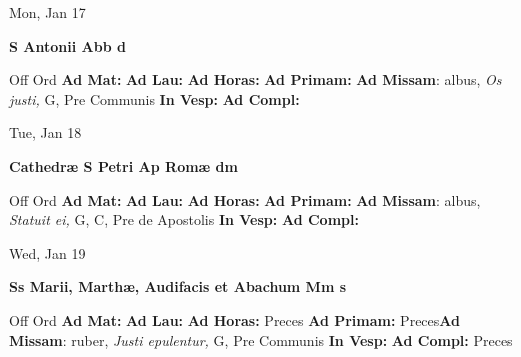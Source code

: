 \documentclass[10pt]{memoir}
\begin{document}
\begin{center}
\begin{minipage}{3.5in}
\vspace{2em}
\begin{center}Mon, Jan 17
\end{center}
\textbf{ \large S Antonii Abb
\textnormal{\normalsize d}}

\begin{justify}Off Ord
\textbf{Ad Mat: }
\textbf{Ad Lau: }
\textbf{Ad Horas: }
\textbf{Ad Primam: }\textbf{Ad Missam}: albus, \textit{Os justi,} G, Pre Communis
\textbf{In Vesp: }
\textbf{Ad Compl: }
\end{justify}
\end{minipage}
\end{center}

\begin{center}
\begin{minipage}{3.5in}
\vspace{2em}
\begin{center}Tue, Jan 18
\end{center}
\textbf{ \large Cathedræ S Petri Ap Romæ
\textnormal{\normalsize dm}}

\begin{justify}Off Ord
\textbf{Ad Mat: }
\textbf{Ad Lau: }
\textbf{Ad Horas: }
\textbf{Ad Primam: }\textbf{Ad Missam}: albus, \textit{Statuit ei,} G, C, Pre de Apostolis
\textbf{In Vesp: }
\textbf{Ad Compl: }
\end{justify}
\end{minipage}
\end{center}

\begin{center}
\begin{minipage}{3.5in}
\vspace{2em}
\begin{center}Wed, Jan 19
\end{center}
\textbf{ \large Ss Marii, Marthæ, Audifacis et Abachum Mm
\textnormal{\normalsize s}}

\begin{justify}Off Ord
\textbf{Ad Mat: }
\textbf{Ad Lau: }
\textbf{Ad Horas: }Preces
\textbf{Ad Primam: }Preces\textbf{Ad Missam}: ruber, \textit{Justi epulentur,} G, Pre Communis
\textbf{In Vesp: }
\textbf{Ad Compl: }Preces
\end{justify}
\end{minipage}
\end{center}
\end{document}
